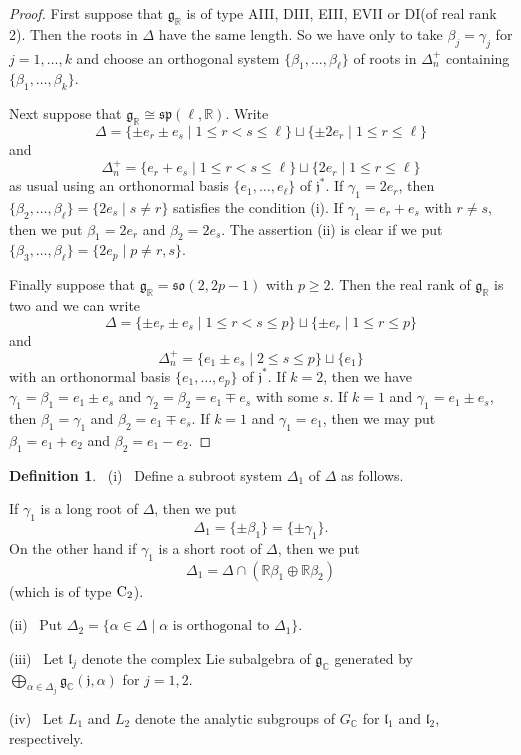 \documentclass[12pt,a4paper]{amsart}
\def\frak{\mathfrak}
\theoremstyle{definition}
\newtheorem{definition}[theorem]{Definition}
\theoremstyle{remark}
\numberwithin{equation}{section}
\def\br{\mathbb R}
\def\bc{\mathbb C}
\begin{document}
\begin{proof} First suppose that $\frak{g}_\br$ is of type AIII, DIII, EIII, EVII or DI(of real rank 2). Then the roots in $\Delta$ have the same length. So we have only to take $\beta_j=\gamma_j$ for $j=1,\ldots,k$ and choose an orthogonal system $\{\beta_1,\ldots,\beta_\ell\}$ of roots in $\Delta^+_n$ containing $\{\beta_1,\ldots,\beta_k\}$.

Next suppose that $\frak{g}_\br\cong \frak{sp}(\ell,\br)$. Write
$$\Delta=\{\pm e_r\pm e_s\mid 1\le r<s\le \ell\}\sqcup \{\pm 2e_r\mid 1\le r\le \ell\}$$
and
$$\Delta^+_n=\{e_r+e_s\mid 1\le r<s\le \ell\}\sqcup \{2e_r\mid 1\le r\le \ell\}$$
as usual using an orthonormal basis $\{e_1,\ldots,e_\ell\}$ of $\frak{j}^*$. If $\gamma_1= 2e_r$, then $\{\beta_2,\ldots,\beta_\ell\}=\{2e_s\mid s\ne r\}$ satisfies the condition (i). If $\gamma_1=e_r+e_s$ with $r\ne s$, then we put $\beta_1=2e_r$ and $\beta_2=2e_s$. The assertion (ii) is clear if we put $\{\beta_3,\ldots,\beta_\ell\}=\{2e_p\mid p\ne r,s\}$.

Finally suppose that $\frak{g}_\br =\frak{so}(2,2p-1)$ with $p\ge 2$. Then the real rank of $\frak{g}_\br$ is two and we can write
$$\Delta=\{\pm e_r\pm e_s\mid 1\le r<s\le p\}\sqcup \{\pm e_r\mid 1\le r\le p\}$$
and
$$\Delta^+_n=\{e_1\pm e_s\mid 2\le s\le p\}\sqcup \{e_1\}$$
with an orthonormal basis $\{e_1,\ldots,e_p\}$ of $\frak{j}^*$. If $k=2$, then we have $\gamma_1=\beta_1=e_1\pm e_s$ and $\gamma_2=\beta_2=e_1\mp e_s$ with some $s$. If $k=1$ and $\gamma_1=e_1\pm e_s$, then $\beta_1=\gamma_1$ and $\beta_2=e_1\mp e_s$. If $k=1$ and $\gamma_1=e_1$, then we may put $\beta_1=e_1+e_2$ and $\beta_2=e_1-e_2$.
\end{proof}

\begin{definition} \ (i) \ Define a subroot system $\Delta_1$ of $\Delta$ as follows.

If $\gamma_1$ is a long root of $\Delta$, then we put
$$\Delta_1=\{\pm\beta_1\}=\{\pm\gamma_1\}.$$
On the other hand if $\gamma_1$ is a short root of $\Delta$, then we put
$$\Delta_1=\Delta\cap (\br\beta_1\oplus\br\beta_2)$$
(which is of type ${\rm C}_2$).

(ii) \ Put $\Delta_2=\{\alpha\in\Delta\mid \alpha\mbox{ is orthogonal to }\Delta_1\}$.

(iii) \ Let $\frak{l}_j$ denote the complex Lie subalgebra of $\frak{g}_\bc$ generated by $\bigoplus_{\alpha\in\Delta_j}\frak{g}_\bc(\frak{j},\alpha)$ for $j=1,2$.

(iv) \ Let $L_1$ and $L_2$ denote the analytic subgroups of $G_\bc$ for $\frak{l}_1$ and $\frak{l}_2$, respectively.
\end{definition}
\end{document}
